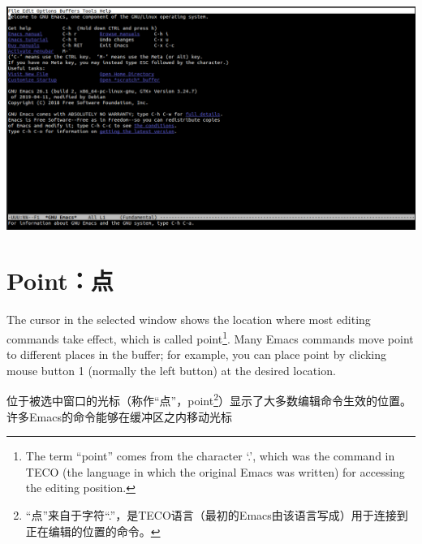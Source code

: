 \begin{center}
	\includegraphics[scale=0.4]{pic/Emacs-Terminal-Defaut}
\end{center}
\section{Point：点}
The cursor in the selected window shows the location where most editing commands take effect, which is called point\footnote{The term “point” comes from the character ‘.’, which was the command in TECO (the language in which the original Emacs was written) for accessing the editing position.}. Many Emacs commands move point to different places in the buffer; for example, you can place point by clicking mouse button 1 (normally the left button) at the desired location.\par
位于被选中窗口的光标（称作“点”，point\footnote{“点”来自于字符“.”，是TECO语言（最初的Emacs由该语言写成）用于连接到正在编辑的位置的命令。}）显示了大多数编辑命令生效的位置。许多Emacs的命令能够在缓冲区之内移动光标